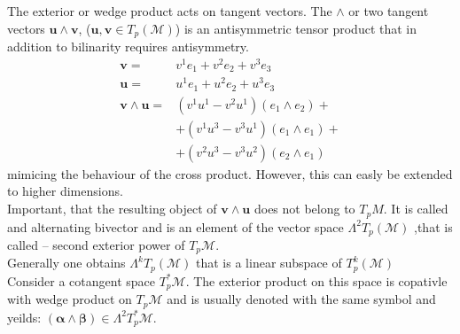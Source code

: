 \documentclass[11pt,a4paper,headinclude=true,DIV=14,BCOR=8mm,chapterprefix,listof=totoc,twoside,openright,abstracton]{scrbook}
\begin{document}
\begin{sidenote}
    The exterior or wedge product acts on tangent vectors. The $\wedge$ or two tangent vectors $\boldsymbol{u}\wedge\boldsymbol{v}$, ($\boldsymbol{u}, \boldsymbol{v}\in T_p(\mathcal{M})$) is an antisymmetric tensor product that in addition to bilinarity requires antisymmetry. 
    \begin{align}
        \boldsymbol{v} =& v^1e_1 + v^2 e_2 + v^3 e_3 \\
        \boldsymbol{u} =& u^1e_1 + u^2 e_2 + u^3 e_3 \\
        \boldsymbol{v}\wedge\boldsymbol{u} =& (v^1u^1 - v^2u^1)(e_1\wedge e_2) + \\
        & + (v^1u^3 - v^3u^1)(e_1\wedge e_1) + \\
        & + (v^2u^3 - v^3u^2)(e_2\wedge e_1)
    \end{align}
    mimicing the behaviour of the cross product. However, this can easly be extended to higher dimensions. \\
    Important, that the resulting object of $\boldsymbol{v}\wedge\boldsymbol{u}$ does not belong to $T_p M$. It is called and alternating bivector and is an element of the vector space $\Lambda^2 T_p (\mathcal{M})$ ,that is called -- second exterior power of $T_p \mathcal{M}$. \\
    Generally one obtains $\Lambda^k T_p (\mathcal{M})$ that is a linear subspace of $T_p ^k (\mathcal{M})$\\
    Consider a cotangent space $T_p ^* \mathcal{M}$. The exterior product on this space is copativle with wedge product on $T_p\mathcal{M}$ and is usually denoted with the same symbol and yeilds: $(\boldsymbol{\alpha}\wedge\boldsymbol{\beta})\in\Lambda^2 T_p ^* \mathcal{M}$.
\end{sidenote}
\end{document}
